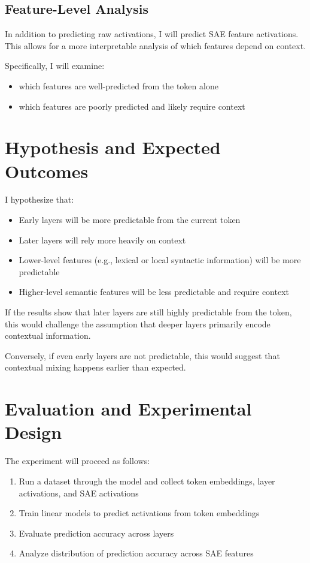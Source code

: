 \documentclass{article}
\begin{document}
\subsection*{Feature-Level Analysis}

In addition to predicting raw activations, I will predict SAE feature activations. This allows for a more interpretable analysis of which features depend on context.

Specifically, I will examine:
\begin{itemize}
    \item which features are well-predicted from the token alone
    \item which features are poorly predicted and likely require context
\end{itemize}

\section{Hypothesis and Expected Outcomes}

I hypothesize that:
\begin{itemize}
    \item Early layers will be more predictable from the current token
    \item Later layers will rely more heavily on context
    \item Lower-level features (e.g., lexical or local syntactic information) will be more predictable
    \item Higher-level semantic features will be less predictable and require context
\end{itemize}

If the results show that later layers are still highly predictable from the token, this would challenge the assumption that deeper layers primarily encode contextual information.

Conversely, if even early layers are not predictable, this would suggest that contextual mixing happens earlier than expected.

\section{Evaluation and Experimental Design}

The experiment will proceed as follows:
\begin{enumerate}
    \item Run a dataset through the model and collect token embeddings, layer activations, and SAE activations
    \item Train linear models to predict activations from token embeddings
    \item Evaluate prediction accuracy across layers
    \item Analyze distribution of prediction accuracy across SAE features
\end{enumerate}
\end{document}

